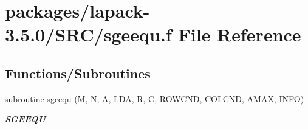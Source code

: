 \hypertarget{sgeequ_8f}{}\section{packages/lapack-\/3.5.0/\+S\+R\+C/sgeequ.f File Reference}
\label{sgeequ_8f}
\subsection*{Functions/\+Subroutines}
\begin{DoxyCompactItemize}
\item 
subroutine \hyperlink{group__realGEcomputational_ga21857aa111bbc0e5231be33c077aa621}{sgeequ} (M, \hyperlink{polmisc_8c_a0240ac851181b84ac374872dc5434ee4}{N}, \hyperlink{classA}{A}, \hyperlink{example__user_8c_ae946da542ce0db94dced19b2ecefd1aa}{L\+D\+A}, R, C, R\+O\+W\+C\+N\+D, C\+O\+L\+C\+N\+D, A\+M\+A\+X, I\+N\+F\+O)
\begin{DoxyCompactList}\small\item\em {\bfseries S\+G\+E\+E\+Q\+U} \end{DoxyCompactList}\end{DoxyCompactItemize}
